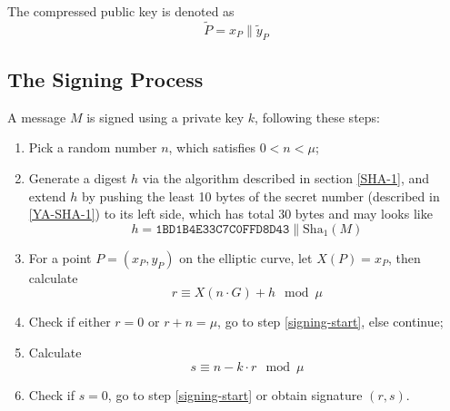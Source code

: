\documentclass[oneside]{article}
\begin{document}
The compressed public key is denoted as
\[\tilde{P}=x_P\parallel\tilde{y}_P\]

\subsection{The Signing Process}\label{sign}
A message $M$ is signed using a private key $k$, following these steps:
\begin{enumerate}
      \item Pick a random number $n$, which satisfies $0<n<\mu$;\label{signing-start}
      \item Generate a digest $h$ via the algorithm described in section \ref{SHA-1}, and extend $h$ by pushing the least 10 bytes of the secret number (described in \ref{YA-SHA-1}) to its left side, which has total 30 bytes and may looks like
            \[h=\mathtt{1BD1B4E33C7C0FFD8D43}\parallel\mathrm{Sha}_1\left(M\right)\]
      \item For a point $P=\left(x_P,y_P\right)$ on the elliptic curve, let $X\left(P\right)=x_P$, then calculate
            \[r\equiv X\left(n\cdot G\right)+h\mod{\mu}\]
      \item Check if either $r=0$ or $r+n=\mu$, go to step \ref{signing-start}, else continue;
      \item Calculate
            \[s\equiv n-k\cdot r\mod{\mu}\]
      \item Check if $s=0$, go to step \ref{signing-start} or obtain signature $\left(r,s\right)$.
\end{enumerate}
\end{document}
